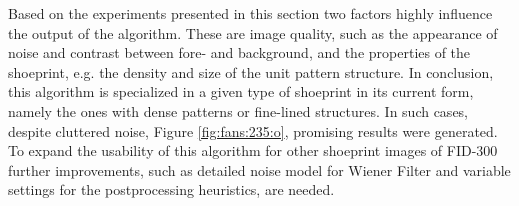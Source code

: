 \documentclass[draft,final]{vutinfth} %
\begin{document}
\par
Based on the experiments presented in this section two factors highly influence the output of the algorithm.
These are image quality, such as the appearance of noise and contrast between fore- and background, and the properties of the shoeprint, e.g. the density and size of the unit pattern structure.
In conclusion, this algorithm is specialized in a given type of shoeprint in its current form, namely the ones with dense patterns or fine-lined structures. 
In such cases, despite cluttered noise, Figure \ref{fig:fans:235:o}, promising results were generated.
To expand the usability of this algorithm for other shoeprint images of FID-300 further improvements, such as detailed noise model for Wiener Filter and variable settings for the postprocessing heuristics, are needed. 
\end{document}
